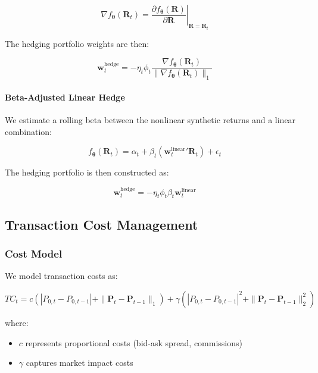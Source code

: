 \begin{equation}
    \nabla f_{\boldsymbol{\theta}}(\mathbf{R}_t) = \left.\frac{\partial f_{\boldsymbol{\theta}}(\mathbf{R})}{\partial \mathbf{R}}\right|_{\mathbf{R}=\mathbf{R}_t}
\end{equation}

The hedging portfolio weights are then:

\begin{equation}
    \mathbf{w}_t^{\text{hedge}} = -\eta_t\phi_t\frac{\nabla f_{\boldsymbol{\theta}}(\mathbf{R}_t)}{\|\nabla f_{\boldsymbol{\theta}}(\mathbf{R}_t)\|_1}
\end{equation}

\paragraph{Beta-Adjusted Linear Hedge}
We estimate a rolling beta between the nonlinear synthetic returns and a linear combination:

\begin{equation}
    f_{\boldsymbol{\theta}}(\mathbf{R}_t) = \alpha_t + \beta_t(\mathbf{w}_t^{\text{linear}}{}'\mathbf{R}_t) + \epsilon_t
\end{equation}

The hedging portfolio is then constructed as:

\begin{equation}
    \mathbf{w}_t^{\text{hedge}} = -\eta_t\phi_t\beta_t\mathbf{w}_t^{\text{linear}}
\end{equation}

\subsection{Transaction Cost Management}

\subsubsection{Cost Model}
We model transaction costs as:

\begin{equation}
    TC_t = c\left(|P_{0,t} - P_{0,t-1}| + \|\mathbf{P}_t - \mathbf{P}_{t-1}\|_1\right) + \gamma(|P_{0,t} - P_{0,t-1}|^2 + \|\mathbf{P}_t - \mathbf{P}_{t-1}\|_2^2)
\end{equation}

where:
\begin{itemize}
    \item $c$ represents proportional costs (bid-ask spread, commissions)
    \item $\gamma$ captures market impact costs
\end{itemize}

